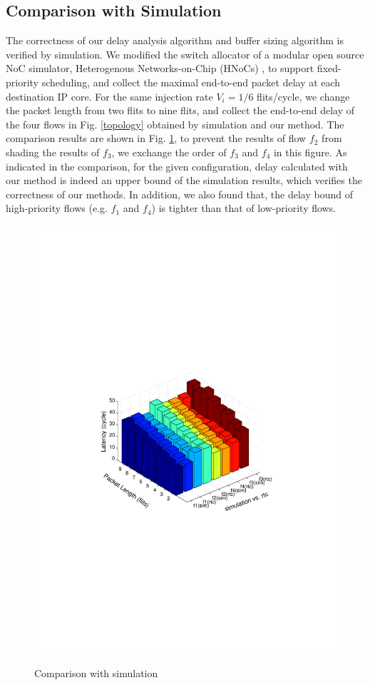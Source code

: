 \documentclass[10pt,journal]{IEEEtran}
\begin{document}
\subsection{Comparison with Simulation}
The correctness of our delay analysis algorithm and buffer sizing algorithm is verified by simulation. We modified the switch allocator of a modular open source NoC simulator, Heterogenous Networks-on-Chip (HNoCs) \cite{6404157}, to support fixed-priority scheduling, and collect the maximal end-to-end packet delay at each destination IP core. For the same injection rate $V_i=1/6$ flits/cycle, we change the packet length from two flits to nine flits, and collect the end-to-end delay of the four flows in Fig. \ref{topology} obtained by simulation and our method. The comparison results are shown in Fig. \ref{rtcvssim}, to prevent the results of flow $f_2$ from shading the results of $f_3$, we exchange the order of $f_3$ and $f_4$ in this figure. As indicated in the comparison, for the given configuration, delay calculated with our method is indeed an upper bound of the simulation results, which verifies the correctness of our methods. In addition, we also found that, the delay bound of high-priority flows (e.g. $f_1$ and $f_4$) is tighter than that of low-priority flows.
\begin{figure}
  \centering
  \includegraphics[scale=0.65]{figures/rtcvssim.pdf}\\
  \caption{Comparison with simulation}\label{rtcvssim}
\end{figure}
\end{document}
